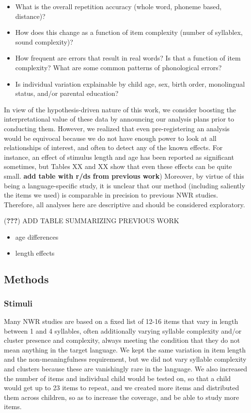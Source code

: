 \documentclass[english,,man,floatsintext]{apa6}
\providecommand{\tightlist}{%
  \setlength{\itemsep}{0pt}\setlength{\parskip}{0pt}}
\begin{document}
\begin{itemize}
\tightlist
\item
  What is the overall repetition accuracy (whole word, phoneme based, distance)?
\item
  How does this change as a function of item complexity (number of syllablex, sound complexity)?
\item
  How frequent are errors that result in real words? Is that a function of item complexity? What are some common patterns of phonological errors?
\item
  Is individual variation explainable by child age, sex, birth order, monolingual status, and/or parental education?
\end{itemize}

In view of the hypothesis-driven nature of this work, we consider boosting the interpretational value of these data by announcing our analysis plans prior to conducting them. However, we realized that even pre-registering an analysis would be equivocal because we do not have enough power to look at all relationships of interest, and often to detect any of the known effects. For instance, an effect of stimulus length and age has been reported as significant sometimes, but Tables XX and XX show that even these effects can be quite small. \textbf{add table with r/ds from previous work})
Moreover, by virtue of this being a language-specific study, it is unclear that our method (including saliently the items we used) is comparable in precision to previous NWR studies. Therefore, all analyses here are descriptive and should be considered exploratory.

({\textbf{???}}) ADD TABLE SUMMARIZING PREVIOUS WORK

\begin{itemize}
\tightlist
\item
  age differences
\item
  length effects
\end{itemize}

\hypertarget{methods}{%
\subsection{Methods}\label{methods}}

\hypertarget{stimuli}{%
\subsubsection{Stimuli}\label{stimuli}}

Many NWR studies are based on a fixed list of 12-16 items that vary in length between 1 and 4 syllables, often additionally varying syllable complexity and/or cluster presence and complexity, always meeting the condition that they do not mean anything in the target language. We kept the same variation in item length and the non-meaningfulness requirement, but we did not vary syllable complexity and clusters because these are vanishingly rare in the language. We also increased the number of items and individual child would be tested on, so that a child would get up to 23 items to repeat, and we created more items and distributed them across children, so as to increase the coverage, and be able to study more items.
\end{document}
